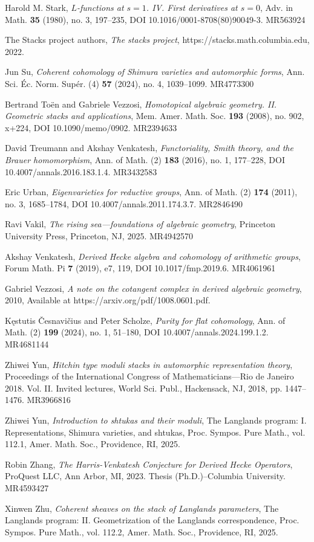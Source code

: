 \begin{refs}
\item[{[Sta80]}] Harold M. Stark, \emph{$L$-functions at $s=1$. IV. First derivatives at $s=0$}, Adv. in Math. \textbf{35} (1980), no. 3, 197--235, DOI 10.1016/0001-8708(80)90049-3. MR563924
\item[{[Sta22]}] The Stacks project authors, \emph{The stacks project}, https://stacks.math.columbia.edu, 2022.
\item[{[Su]}] Jun Su, \emph{Coherent cohomology of Shimura varieties and automorphic forms}, Ann. Sci. \'Ec. Norm. Sup\'er. (4) \textbf{57} (2024), no. 4, 1039--1099. MR4773300
\item[{[TV08]}] Bertrand To\"en and Gabriele Vezzosi, \emph{Homotopical algebraic geometry. II. Geometric stacks and applications}, Mem. Amer. Math. Soc. \textbf{193} (2008), no. 902, x+224, DOI 10.1090/memo/0902. MR2394633
\item[{[TV16]}] David Treumann and Akshay Venkatesh, \emph{Functoriality, Smith theory, and the Brauer homomorphism}, Ann. of Math. (2) \textbf{183} (2016), no. 1, 177--228, DOI 10.4007/annals.2016.183.1.4. MR3432583
\item[{[Urb11]}] Eric Urban, \emph{Eigenvarieties for reductive groups}, Ann. of Math. (2) \textbf{174} (2011), no. 3, 1685--1784, DOI 10.4007/annals.2011.174.3.7. MR2846490
\item[{[Vak24]}] Ravi Vakil, \emph{The rising sea---foundations of algebraic geometry}, Princeton University Press, Princeton, NJ, 2025. MR4942570
\item[{[Ven19]}] Akshay Venkatesh, \emph{Derived Hecke algebra and cohomology of arithmetic groups}, Forum Math. Pi \textbf{7} (2019), e7, 119, DOI 10.1017/fmp.2019.6. MR4061961
\item[{[Vez10]}] Gabriel Vezzosi, \emph{A note on the cotangent complex in derived algebraic geometry}, 2010, Available at https://arxiv.org/pdf/1008.0601.pdf.
\item[{[vS24]}] K\k{e}stutis \v{C}esnavi\v{c}ius and Peter Scholze, \emph{Purity for flat cohomology}, Ann. of Math. (2) \textbf{199} (2024), no. 1, 51--180, DOI 10.4007/annals.2024.199.1.2. MR4681144
\item[{[Yun18]}] Zhiwei Yun, \emph{Hitchin type moduli stacks in automorphic representation theory}, Proceedings of the International Congress of Mathematicians---Rio de Janeiro 2018. Vol. II. Invited lectures, World Sci. Publ., Hackensack, NJ, 2018, pp. 1447--1476. MR3966816
\item[{[Zhi25]}] Zhiwei Yun, \emph{Introduction to shtukas and their moduli}, The Langlands program: I. Representations, Shimura varieties, and shtukas, Proc. Sympos. Pure Math., vol. 112.1, Amer. Math. Soc., Providence, RI, 2025.
\item[{[Zha23]}] Robin Zhang, \emph{The Harris-Venkatesh Conjecture for Derived Hecke Operators}, ProQuest LLC, Ann Arbor, MI, 2023. Thesis (Ph.D.)--Columbia University. MR4593427
\item[{[Zhu25]}] Xinwen Zhu, \emph{Coherent sheaves on the stack of Langlands parameters}, The Langlands program: II. Geometrization of the Langlands correspondence, Proc. Sympos. Pure Math., vol. 112.2, Amer. Math. Soc., Providence, RI, 2025.
\end{refs}

